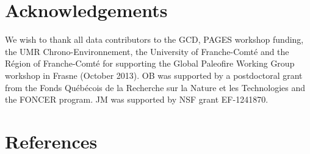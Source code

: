 \documentclass{elsarticle}
\begin{document}
\section{Acknowledgements}


We wish to thank all data contributors to the GCD, PAGES workshop funding, the UMR Chrono-Environnement, the University of Franche-Comté and the Région of Franche-Comté for supporting the Global Paleofire Working Group workshop in Frasne (October 2013). OB was supported by a postdoctoral grant from the Fonds Québécois de la Recherche sur la Nature et les Technologies and the FONCER program. JM was supported by NSF grant EF-1241870.


\section{References}

\end{document}
